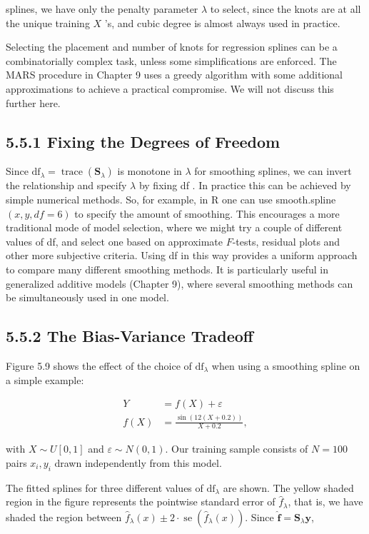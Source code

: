 \documentclass[10pt]{article}
\begin{document}
splines, we have only the penalty parameter $\lambda$ to select, since the knots are at all the unique training $X$ 's, and cubic degree is almost always used in practice.

Selecting the placement and number of knots for regression splines can be a combinatorially complex task, unless some simplifications are enforced. The MARS procedure in Chapter 9 uses a greedy algorithm with some additional approximations to achieve a practical compromise. We will not discuss this further here.

\subsection*{5.5.1 Fixing the Degrees of Freedom}
Since $\mathrm{df}_{\lambda}=\operatorname{trace}\left(\mathbf{S}_{\lambda}\right)$ is monotone in $\lambda$ for smoothing splines, we can invert the relationship and specify $\lambda$ by fixing df . In practice this can be achieved by simple numerical methods. So, for example, in R one can use smooth.spline $(x, y, d f=6)$ to specify the amount of smoothing. This encourages a more traditional mode of model selection, where we might try a couple of different values of df, and select one based on approximate $F$-tests, residual plots and other more subjective criteria. Using df in this way provides a uniform approach to compare many different smoothing methods. It is particularly useful in generalized additive models (Chapter 9), where several smoothing methods can be simultaneously used in one model.

\subsection*{5.5.2 The Bias-Variance Tradeoff}
Figure 5.9 shows the effect of the choice of $\mathrm{df}_{\lambda}$ when using a smoothing spline on a simple example:


\begin{align*}
Y & =f(X)+\varepsilon \\
f(X) & =\frac{\sin (12(X+0.2))}{X+0.2}, \tag{5.22}
\end{align*}


with $X \sim U[0,1]$ and $\varepsilon \sim N(0,1)$. Our training sample consists of $N=100$ pairs $x_{i}, y_{i}$ drawn independently from this model.

The fitted splines for three different values of $\mathrm{df}_{\lambda}$ are shown. The yellow shaded region in the figure represents the pointwise standard error of $\hat{f}_{\lambda}$, that is, we have shaded the region between $\hat{f}_{\lambda}(x) \pm 2 \cdot \operatorname{se}\left(\hat{f}_{\lambda}(x)\right)$. Since $\hat{\mathbf{f}}=\mathbf{S}_{\lambda} \mathbf{y}$,
\end{document}
